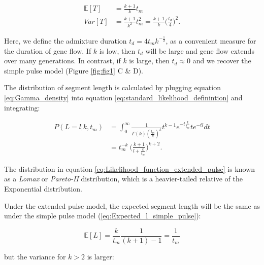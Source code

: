 \documentclass[11pt]{article}
\begin{document}
\begin{equation}
\begin{split}
\label{eq:RV_extended_pulse_properties}
\mathbb{E}[T]&= \frac{k+1}{k}t_{m} \\
	Var[T]&=\frac{k+1}{k^2}t_{m}^2 =
\frac{k+1}{k}\bigg(\frac{t_d}{4} \bigg)^2 \text{.}
\end{split}
\end{equation}
	
Here, we define the admixture duration $t_d=4t_m k^{-\frac{1}{2}} $, as a convenient measure for the duration of gene flow. If $k$ is low, then $t_d$ will be large and gene flow extends over many generations. In contrast, if $k$ is large, then $t_d \approx 0$ and we recover the simple pulse model (Figure \ref{fig:fig1} C \& D). 
	
	
The distribution of segment length is calculated by plugging equation \ref{eq:Gamma_density} into  equation  \ref{eq:standard_likelihood_definintion} and integrating:

\begin{align}
\label{eq:Likelihood_function_extended_pulse}
    P(L=l | k, t_m) &= \int_{0}^{\infty} \frac{1}{\Gamma(k)(\frac{t_m}{k})^k}t^{k-1}e^{-t\frac{k}{t_m}}t e^{-tl}dt \nonumber\\
    &= t_{m}^{-k} \ \Bigg( \frac{k+1}{l +\frac{k}{t_{m}}}\Bigg)^{k+2}
	\text{.}
\end{align}	
	

The distribution  in equation \ref{eq:Likelihood_function_extended_pulse} is known as a \emph{Lomax} or \emph{Pareto-II} distribution, which is a heavier-tailed relative of the Exponential distribution. 
	
	
Under the extended pulse model, the expected segment length will be the same as under the simple pulse model (\ref{eq:Expected_l_simple_pulse}):
	
\begin{equation}
\label{eq:Expected_l_extended_pulse}
    \mathbb{E}[L] = \frac{k}{t_m}\frac{1}{(k+1)-1} = \frac{1}{t_{m}}
\end{equation}
	
	
but the variance for $k>2$ is larger:
	
\end{document}
